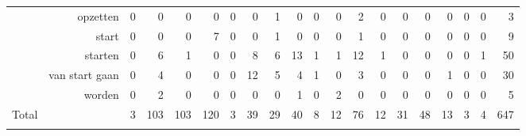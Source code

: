 \begin{table}
{\begin{tabular}{lrrrrrrrrrrrrrrrrrr|r}
& opzetten &  0 &  0 &  0 &  0 &  0 &  0 &  1 &  0 &  0 &  0 &  2 &  0 &  0 &  0 &  0 &  0 &  0 &  3\\
& start &  0 &  0 &  0 &  7 &  0 &  0 &  1 &  0 &  0 &  0 &  1 &  0 &  0 &  0 &  0 &  0 &  0 &  9\\
& starten &  0 &  6 &  1 &  0 &  0 &  8 &  6 &  13 &  1 &  1 &  12 &  1 &  0 &  0 &  0 &  0 &  1 &  50\\
& van start gaan &  0 &  4 &  0 &  0 &  0 &  12 &  5 &  4 &  1 &  0 &  3 &  0 &  0 &  0 &  1 &  0 &  0 &  30\\
& worden &  0 &  2 &  0 &  0 &  0 &  0 &  0 &  1 &  0 &  2 &  0 &  0 &  0 &  0 &  0 &  0 &  0 &  5\\
\hline
Total & & 3 &  103 &  103 &  120 &  3 &  39 &  29 &  40 &  8 &  12 &  76 &  12 &  31 &  48 &  13 &  3 &  4 &  647\\
\lspbottomrule
\end{tabular}
}
\end{table} 

\newpage
